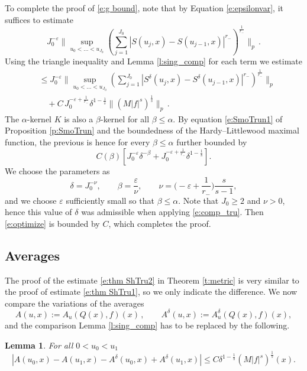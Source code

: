 \documentclass[12pt,reqno,a4paper,dvipsnames]{amsart}
\theoremstyle{plain}
\newtheorem{lemma}[theorem]{Lemma}
\theoremstyle{definition}
\numberwithin{theorem}{section}
\numberwithin{equation}{section}
\begin{document}
To complete the proof of \eqref{e:g bound}, note that by Equation \eqref{e:epsilonvar}, it suffices to estimate
\[
    J_0^{-\varepsilon} \Big\|\sup_{u_0<\dots <u_{J_0}} (\sum_{j=1}^{J_0} |S(u_j, x)-S(u_{j-1},x)|^{r_-})^{\frac{1}{r_-}}\Big\|_p\,.
\]
Using the triangle inequality and Lemma \ref{l:sing_comp} for each term we estimate
\begin{align*}
    &\le J_0^{-\varepsilon} \Big\|\sup_{u_0<\dots <u_{J_0}} (\sum_{j=1}^{J_0} |S^{\delta}(u_j, x)-S^{\delta}(u_{j-1},x)|^{r_-})^{\frac{1}{r_-}}\Big\|_p\\
    &\quad + C \, J_0^{-\varepsilon + \frac{1}{r_-}} \delta^{1 - \frac{1}{s}} \|(M |f|^s)^\frac{1}{s}\|_p\,.
\end{align*}
The $\alpha$-kernel $K$ is also a $\beta$-kernel for all $\beta \le \alpha$. 
By equation \eqref{e:SmoTrun1} of Proposition \ref{p:SmoTrun} and the boundedness of the Hardy--Littlewood maximal function, the previous is hence for every $\beta \le \alpha$ further bounded by
\begin{equation}
    \label{e:optimize}
    C(\beta)[J_0^{-\varepsilon} \delta^{-\beta} + J_0^{-\varepsilon + \frac{1}{r_-}} \delta^{1 - \frac{1}{s}}].
\end{equation}
We choose the parameters as 
\[
    \delta = J_0^{-\nu}, \qquad \beta = \frac{\varepsilon}{\nu}, \qquad  \nu = \Big(-\varepsilon + \frac{1}{r_-}\Big)\frac{s}{s-1},
\]
and we choose $\varepsilon$ sufficiently small so that $\beta \le \alpha$. Note that $J_0 \ge 2$ and $\nu > 0$, hence this value of $\delta$ was admissible when applying \eqref{e:comp_tru}. 
Then \eqref{e:optimize} is bounded by $C$, which completes the proof.
 
\subsection{Averages}
The proof of the estimate  \eqref{e:thm ShTru2} in Theorem \ref{t:metric} is very similar to the proof of estimate \eqref{e:thm ShTru1}, so we only indicate the difference. We now compare the variations of the averages
\begin{equation*}
    A(u,x) := A_u(Q(x), f)(x)\,, \qquad A^\delta(u,x) := A_u^\delta(Q(x), f)(x),
\end{equation*}
and the comparison Lemma \ref{l:sing_comp} has to be replaced by the following. 

\begin{lemma}
    \label{l:avg_comp}
    For all $0 < u_0 < u_1$
    \begin{equation*}
        |A(u_0, x) - A(u_1,x) - A^\delta(u_0,x) + A^\delta(u_1,x)| \le C \delta^{1 -\frac{1}{s}} (M |f|^s)^\frac{1}{s}(x).
    \end{equation*}
\end{lemma}
\end{document}
